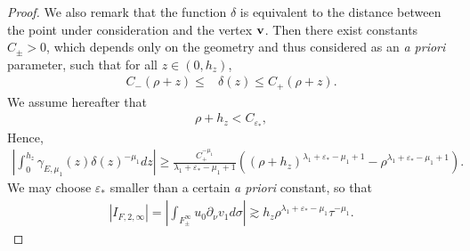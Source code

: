 ﻿\documentclass[11pt,reqno,oneside]{amsart}
\theoremstyle{definition}
\theoremstyle{remark}
\renewcommand{\d}{\delta}
\newcommand{\e}{\varepsilon}
\newcommand{\g}{\gamma}
\newcommand{\lm}{\lambda}
\newcommand{\p}{\partial}
\begin{document}
\begin{proof}
            We also remark that the function $\d$ is equivalent to the distance between the point under consideration and the vertex $\bf{v}$. Then there exist constants $C_\pm>0$, which depends only on the geometry and thus considered as an {\it a priori} parameter, such that for all $z\in (0,h_z)$,
            \begin{align}\label{eq:delta-eqv}
                C_- (\rho+z) \leq &\d(z)\leq C_+ (\rho+z).
            \end{align}
            We assume hereafter that 
            \begin{align}\label{eq:constraint3}
                \rho+h_z<C_{\e_*},
            \end{align}     
            Hence,   
            \begin{align*}
                \left|\int_0^{h_z} \g_{E,\mu_1}(z) \d(z)^{-\mu_1} dz \right| \geq \frac{C_+^{-\mu_1}}{\lm_1+\e_*-\mu_1+1} \left((\rho+h_z)^{\lm_1+\e_*-\mu_1+1}-\rho^{\lm_1+\e_*-\mu_1+1}\right). 
            \end{align*}           
            We may choose $\e_*$ smaller than a certain {\it a priori} constant, so that
            \begin{align}\label{eq:esti-F2-infty}
                |I_{F,2,\infty}|=\left| \int_{F_\pm^\infty} u_0 \p_\nu v_1 d\sigma \right| \gtrsim  h_z \rho^{\lm_1+\e_*-\mu_1} \tau^{-\mu_1}.
            \end{align}


\end{proof}
\end{document}
